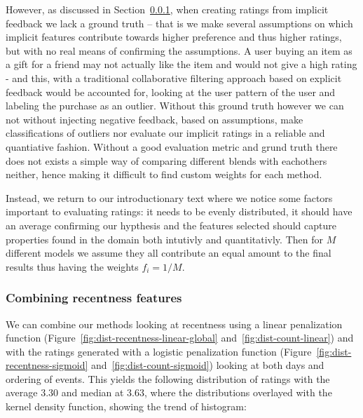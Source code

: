 However, as discussed in Section~\ref{}, when creating ratings from implicit
feedback we lack a ground truth – that is we make several assumptions on which
implicit features contribute towards higher preference and thus higher ratings,
but with no real means of confirming the assumptions. A user buying an item as
a gift for a friend may not actually like the item and would not give a high
rating - and this, with a traditional collaborative filtering approach based on
explicit feedback would be accounted for, looking at the user pattern of the
user and labeling the purchase as an outlier. Without this ground truth however
we can not without injecting negative feedback, based on assumptions, make
classifications of outliers nor evaluate our implicit ratings in a reliable and
quantiative fashion. Without a good evaluation metric and grund truth there
does not exists a simple way of comparing different blends with eachothers
neither, hence making it difficult to find custom weights for each method.

Instead, we return to our introductionary text where we notice some factors
important to evaluating ratings: it needs to be evenly distributed, it should
have an average confirming our hypthesis and the features selected should
capture properties found in the domain both intutivly and quantitativly.  Then
for $M$ different models we assume they all contribute an equal amount to the
final results thus having the weights $f_i = 1/M$. 

\subsubsection{Combining recentness features}

We can combine our methods looking at recentness using a linear penalization
function (Figure~\ref{fig:dist-recentness-linear-global}
and~\ref{fig:dist-count-linear}) and with the ratings generated with a logistic
penalization function (Figure~\ref{fig:dist-recentness-sigmoid}
and~\ref{fig:dist-count-sigmoid}) looking at both days and ordering of events.
This yields the following distribution of ratings with the average $3.30$ and
median at $3.63$, where the distributions overlayed with the kernel density
function, showing the trend of histogram:

